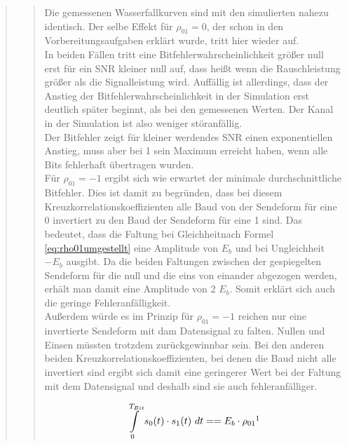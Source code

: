 \begin{quote}
\begin{quote}
       \vspace{2em}    
    
    Die gemessenen Wasserfallkurven sind mit den simulierten nahezu identisch. Der selbe Effekt für $\rho_{01}=0$, der
    schon in den Vorbereitungsaufgaben erklärt wurde, tritt hier wieder auf.\\
    In beiden Fällen tritt eine Bitfehlerwahrscheinlichkeit größer null erst für ein SNR kleiner null auf, dass heißt
    wenn die Rauschleistung größer als die Signalleistung wird. Auffällig ist allerdings, dass der Anstieg der
    Bitfehlerwahrscheinlichkeit in der Simulation erst deutlich später beginnt, als bei den gemessenen Werten. Der Kanal
    in der Simulation ist also weniger störanfällig.\\
    Der Bitfehler zeigt für kleiner werdendes SNR einen exponentiellen Anstieg, muss aber bei 1 sein Maximum
    erreicht haben, wenn alle Bits fehlerhaft übertragen wurden.\\
    Für $\rho_{01}=-1$ ergibt sich wie erwartet der minimale durchschnittliche Bitfehler. Dies ist damit zu begründen,
    dass bei diesem Kreuzkorrelationskoeffizienten alle Baud von der Sendeform für eine 0 invertiert zu den Baud der
    Sendeform für eine 1 sind. Das bedeutet, dass die Faltung bei Gleichheitnach Formel \ref{eq:rho01umgestellt} eine
    Amplitude von $E_{b}$ und bei Ungleichheit $-E_{b}$ ausgibt. Da die beiden Faltungen zwischen der gespiegelten Sendeform für die null und die eins
    von einander abgezogen werden, erhält man damit eine Amplitude von 2 $E_{b}$. Somit erklärt sich auch die geringe
    Fehleranfälligkeit. \\
    Außerdem würde es im Prinzip für $\rho_{01}=-1$ reichen nur eine invertierte Sendeform mit dam
    Datensignal zu falten. Nullen und Einsen müssten trotzdem zurückgewinnbar sein. Bei den anderen beiden 
    Kreuzkorrelationskoeffizienten, bei denen die Baud nicht alle invertiert sind ergibt sich damit eine geringerer Wert
    bei der Faltung mit dem Datensignal und deshalb sind sie auch fehleranfälliger.
    
    \begin{equation}
	     \begin{split}
		\int\limits_{0}^{T_{Bit}}  s_{0}(t) \cdot s_{1}(t)  \ dt = = E_{b} \cdot \rho_{01}
           \footnotemark
	     \end{split}
    \end{equation} 
     \label{eq:rho01umgestellt}
    
    \end{quote}
     
\end{quote}

